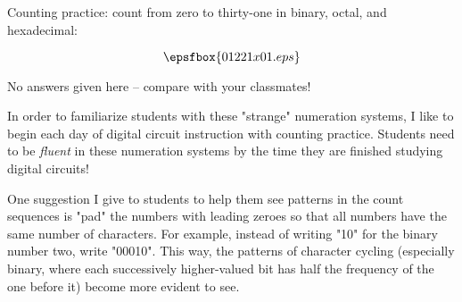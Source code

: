 

Counting practice: count from zero to thirty-one in binary, octal, and hexadecimal:

$$\epsfbox{01221x01.eps}$$







No answers given here -- compare with your classmates!







In order to familiarize students with these "strange" numeration systems, I like to begin each day of digital circuit instruction with counting practice.  Students need to be {\it fluent} in these numeration systems by the time they are finished studying digital circuits!

One suggestion I give to students to help them see patterns in the count sequences is "pad" the numbers with leading zeroes so that all numbers have the same number of characters.  For example, instead of writing "10" for the binary number two, write "00010".  This way, the patterns of character cycling (especially binary, where each successively higher-valued bit has half the frequency of the one before it) become more evident to see.





